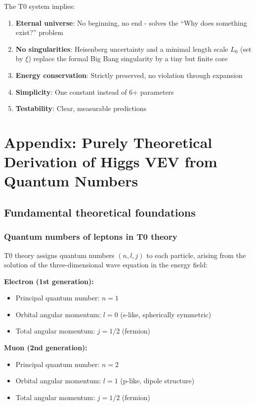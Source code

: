 \documentclass[12pt,a4paper]{report}
\begin{document}
The T0 system implies:
\begin{enumerate}
	\item \textbf{Eternal universe}: No beginning, no end - solves the ``Why does something exist?'' problem
	\item \textbf{No singularities}: Heisenberg uncertainty and a minimal length scale $L_0$ (set by $\xi$) replace the formal Big Bang singularity by a tiny but finite core
	\item \textbf{Energy conservation}: Strictly preserved, no violation through expansion
	\item \textbf{Simplicity}: One constant instead of 6+ parameters
	\item \textbf{Testability}: Clear, measurable predictions
\end{enumerate}
\section{Appendix: Purely Theoretical Derivation of Higgs VEV from Quantum Numbers}

\subsection{Fundamental theoretical foundations}

\subsubsection{Quantum numbers of leptons in T0 theory}

T0 theory assigns quantum numbers $(n, l, j)$ to each particle, arising from the solution of the three-dimensional wave equation in the energy field:

\textbf{Electron (1st generation):}
\begin{itemize}
	\item Principal quantum number: $n = 1$
	\item Orbital angular momentum: $l = 0$ (s-like, spherically symmetric)
	\item Total angular momentum: $j = 1/2$ (fermion)
\end{itemize}

\textbf{Muon (2nd generation):}
\begin{itemize}
	\item Principal quantum number: $n = 2$
	\item Orbital angular momentum: $l = 1$ (p-like, dipole structure)
	\item Total angular momentum: $j = 1/2$ (fermion)
\end{itemize}
\end{document}
